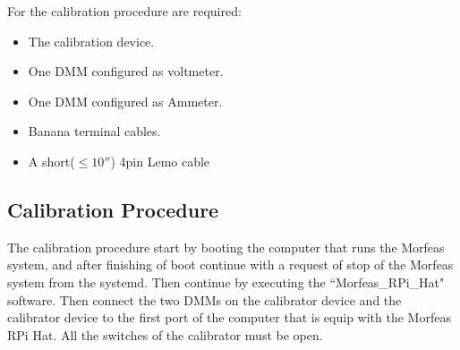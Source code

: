 For the calibration procedure are required:
\begin{itemize}
	\item The calibration device.
	\item One DMM configured as voltmeter.
	\item One DMM configured as Ammeter.
	\item Banana terminal cables.
	\item A short($\leq10''$) 4pin Lemo cable
\end{itemize}
\newpage
\subsection{Calibration Procedure}
The calibration procedure start by booting the computer that runs the Morfeas system,
and after finishing of boot continue with a request of stop of the Morfeas system from the systemd.
Then continue by executing the ``Morfeas\_RPi\_Hat" software.
Then connect the two DMMs on the calibrator device and the calibrator device to the first port of the computer that is equip with the Morfeas RPi Hat.
All the switches of the calibrator must be open.\\


